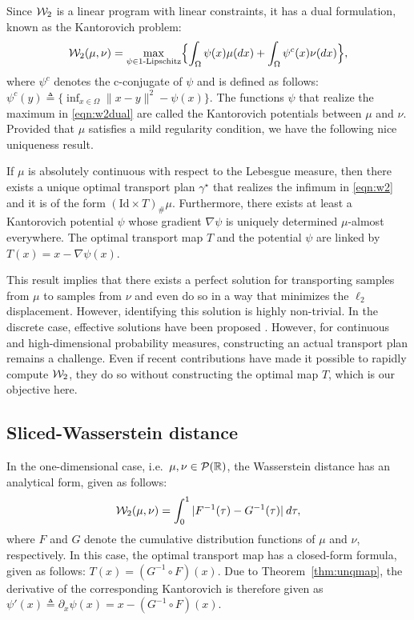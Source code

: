 Since ${\cal W}_2$ is a linear program with linear constraints, it has a dual formulation, known as the Kantorovich problem:
\begin{align}
{\cal W}_2(\mu,\nu) = \max_{\psi \in \textnormal{1-Lipschitz}} \Bigl\{ \int_\Omega \psi(x) \mu(dx) + \int_\Omega \psi^c(x) \nu(dx) \Bigr\}, \label{eqn:w2dual}
\end{align}
where $\psi^c$ denotes the c-conjugate of $\psi$ and is defined as follows: $\psi^c(y) \triangleq \{ \inf_{x\in \Omega} \| x-y\|^2 - \psi(x)\}$. The functions $\psi$ that realize the maximum in \eqref{eqn:w2dual} are called the Kantorovich potentials between $\mu$ and $\nu$.
%
Provided that $\mu$ satisfies a mild regularity condition, we have the following nice uniqueness result.
\begin{thm}
\label{thm:unqmap}
If $\mu$ is absolutely continuous with respect to the Lebesgue measure, then there exists a unique optimal transport plan $\gamma^\star$ that realizes the infimum in \eqref{eqn:w2} and it is of the form $(\text{Id} \times T)_\# \mu$. Furthermore, there exists at least a Kantorovich potential $\psi$ whose gradient $\nabla \psi$ is uniquely determined $\mu$-almost everywhere. The optimal transport map $T$ and the potential $\psi$ are linked by $T(x) = x- \nabla \psi(x)$.
\end{thm}
 

This result implies that there exists a perfect solution for transporting samples from $\mu$ to samples from $\nu$ and even do so in a way that minimizes the $\ell_2$ displacement. However, identifying this solution is highly non-trivial. In the discrete case, effective solutions have been proposed \cite{cuturi2013sinkhorn}. However, for continuous and high-dimensional probability measures, constructing an actual transport plan remains a challenge. Even if recent contributions \cite{genevay2016stochastic} have made it possible to rapidly compute ${\cal W}_2$, they do so without constructing the optimal map $T$, which is our objective here.

\subsection{Sliced-Wasserstein distance}

In the one-dimensional case, i.e.\ $\mu,\nu \in {\cal P}(\mathbb{R})$, the Wasserstein distance has an analytical form, given as follows:
\begin{align}
{\cal W}_2(\mu,\nu) = \int_0^1 |F^{-1}(\tau) - G^{-1}(\tau)| \> d\tau,
\end{align}
where $F$ and $G$ denote the cumulative distribution functions of $\mu$ and $\nu$, respectively. In this case, the optimal transport map has a closed-form formula, given as follows: $T(x) = (G^{-1} \circ F) (x)$. Due to Theorem~\ref{thm:unqmap}, the derivative of the corresponding Kantorovich is therefore given as $\psi'(x) \triangleq \partial_x \psi(x) = x- (G^{-1} \circ F) (x)$.
 
